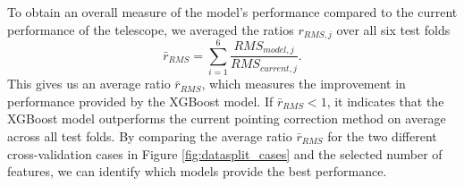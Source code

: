 To obtain an overall measure of the model's performance compared to the current performance of the telescope, we averaged the ratios $r_{RMS,j}$ over all six test folds
\begin{equation} \label{eq:mean_rms_compared}
    \bar{r}_{RMS} = \sum_{i=1}^6 \frac{RMS_{model,j}}{RMS_{current,j}}.
\end{equation}
This gives us an average ratio $\bar{r}_{RMS}$, which measures the improvement in performance provided by the XGBoost model.
If $\bar{r}_{RMS} < 1$, it indicates that the XGBoost model outperforms the current pointing correction method on average across all test folds.
By comparing the average ratio $\bar{r}_{RMS}$ for the two different cross-validation cases in Figure \ref{fig:datasplit_cases} and the selected number of features,
we can identify which models provide the best performance.
